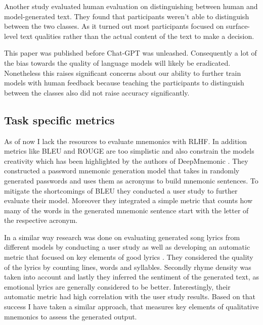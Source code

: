 Another study \cite{clark2020human} evaluated human evaluation on distinguishing between human and model-generated text. They found that participants weren't able to distinguish between the two classes. As it turned out most participants focused on surface-level text qualities rather than the actual content of the text to make a decision.

This paper was published before Chat-GPT was unleashed. Consequently a lot of the bias towards the quality of language models will likely be eradicated. Nonetheless this raises significant concerns about our ability to further train models with human feedback because teaching the participants to distinguish between the classes also did not raise accuracy significantly.

\subsection{Task specific metrics}
As of now I lack the resources to evaluate mnemonics with RLHF. In addition metrics like BLEU and ROUGE are too simplistic and also constrain the models creativity which has been highlighted by the authors of DeepMnemonic \cite{deepMnemonic2022}. They constructed a password mnemonic generation model that takes in randomly generated passwords and uses them as acronyms to build mnemonic sentences. To mitigate the shortcomings of BLEU they conducted a user study to further evaluate their model. Moreover they integrated a simple metric that counts how many of the words in the generated mnemonic sentence start with the letter of the respective acronym. 

In a similar way research was done on evaluating generated song lyrics from different models by conducting a user study as well as developing an automatic metric that focused on key elements of good lyrics \cite{lyrics_gen_2021}. They considered the quality of the lyrics by counting lines, words and syllables. Secondly rhyme density was taken into account and lastly they inferred the sentiment of the generated text, as emotional lyrics are generally considered to be better. Interestingly, their automatic metric had high correlation with the user study results. Based on that success I have taken a similar approach, that measures key elements of qualitative mnemonics to assess the generated output. 

